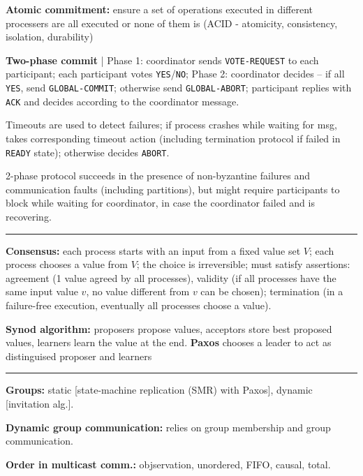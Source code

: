 \documentclass{form}
\begin{document}
\begin{multicols*}{2}
\textbf{Atomic commitment:} ensure a set of operations executed in different processers are all executed or none of them is (ACID - atomicity, consistency, isolation, durability)

\textbf{Two-phase commit} | Phase 1: coordinator sends \texttt{VOTE-REQUEST} to each participant; each participant votes \texttt{YES}/\texttt{NO}; Phase 2: coordinator decides -- if all \texttt{YES}, send \texttt{GLOBAL-COMMIT}; otherwise send \texttt{GLOBAL-ABORT}; participant replies with \texttt{ACK} and decides according to the coordinator message.

Timeouts are used to detect failures; if process crashes while waiting for msg, takes corresponding timeout action (including termination protocol if failed in \texttt{READY} state); otherwise decides \texttt{ABORT}.

2-phase protocol succeeds in the presence of non-byzantine failures and communication faults (including partitions), but might require participants to block while waiting for coordinator, in case the coordinator failed and is recovering.

\vspace{-1em}\rule{\linewidth}{0.4pt}

\textbf{Consensus:} each process starts with an input from a fixed value set $V$; each process chooses a value from $V$; the choice is irreversible; must satisfy assertions: agreement (1 value agreed by all processes), validity (if all processes have the same input value $v$, no value different from $v$ can be chosen); termination (in a failure-free execution, eventually all processes choose a value).

\textbf{Synod algorithm:} proposers propose values, acceptors store best proposed values, learners learn the value at the end. \textbf{Paxos} chooses a leader to act as distinguised proposer and learners

\vspace{-1em}\rule{\linewidth}{0.4pt}

\textbf{Groups:} static [state-machine replication (SMR) with Paxos], dynamic [invitation alg.].

\textbf{Dynamic group communication:} relies on group membership and group communication.

\textbf{Order in multicast comm.:} objservation, unordered, FIFO, causal, total.

\end{multicols*}
\end{document}
